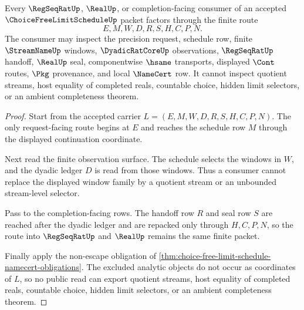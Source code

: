 \begin{theorem}
\label{thm:choice-free-limit-schedule-nonescape}
Every $\RegSeqRatUp$, $\RealUp$, or completion-facing consumer of an accepted $\ChoiceFreeLimitScheduleUp$ packet factors through the finite route
$$
E,M,W,D,R,S,H,C,P,N.
$$
The consumer may inspect the precision request, schedule row, finite $\StreamNameUp$ windows, $\DyadicRatCoreUp$ observations, $\RegSeqRatUp$ handoff, $\RealUp$ seal, componentwise $\hsame$ transports, displayed $\Cont$ routes, $\Pkg$ provenance, and local $\NameCert$ row. It cannot inspect quotient streams, host equality of completed reals, countable choice, hidden limit selectors, or an ambient completeness theorem.
\end{theorem}
\begin{proof}
Start from the accepted carrier $L=(E,M,W,D,R,S,H,C,P,N)$. The only request-facing route begins at $E$ and reaches the schedule row $M$ through the displayed continuation coordinate.

Next read the finite observation surface. The schedule selects the windows in $W$, and the dyadic ledger $D$ is read from those windows. Thus a consumer cannot replace the displayed window family by a quotient stream or an unbounded stream-level selector.

Pass to the completion-facing rows. The handoff row $R$ and seal row $S$ are reached after the dyadic ledger and are repacked only through $H,C,P,N$, so the route into $\RegSeqRatUp$ and $\RealUp$ remains the same finite packet.

Finally apply the non-escape obligation of \autoref{thm:choice-free-limit-schedule-namecert-obligations}. The excluded analytic objects do not occur as coordinates of $L$, so no public read can export quotient streams, host equality of completed reals, countable choice, hidden limit selectors, or an ambient completeness theorem.
\end{proof}

